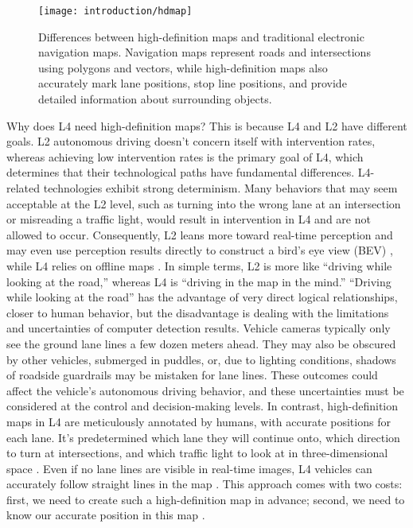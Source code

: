 \begin{figure}[!t]
	\centering
	\texttt{[image: introduction/hdmap]}
	\caption{Differences between high-definition maps and traditional electronic navigation maps. Navigation maps represent roads and intersections using polygons and vectors, while high-definition maps also accurately mark lane positions, stop line positions, and provide detailed information about surrounding objects.}
	\label{fig:hdmap}
\end{figure}

Why does L4 need high-definition maps? This is because L4 and L2 have different goals. L2 autonomous driving doesn't concern itself with intervention rates, whereas achieving low intervention rates is the primary goal of L4, which determines that their technological paths have fundamental differences. L4-related technologies exhibit strong determinism. Many behaviors that may seem acceptable at the L2 level, such as turning into the wrong lane at an intersection or misreading a traffic light, would result in intervention in L4 and are not allowed to occur. Consequently, L2 leans more toward real-time perception and may even use perception results directly to construct a bird's eye view (BEV) \cite{Sun2020, Ng2020, Hendy2020}, while L4 relies on offline maps \cite{Levinson2010, Wolcott2014, Matthaei2014}. In simple terms, L2 is more like ``driving while looking at the road,'' whereas L4 is ``driving in the map in the mind.'' ``Driving while looking at the road'' has the advantage of very direct logical relationships, closer to human behavior, but the disadvantage is dealing with the limitations and uncertainties of computer detection results. Vehicle cameras typically only see the ground lane lines a few dozen meters ahead. They may also be obscured by other vehicles, submerged in puddles, or, due to lighting conditions, shadows of roadside guardrails may be mistaken for lane lines. These outcomes could affect the vehicle's autonomous driving behavior, and these uncertainties must be considered at the control and decision-making levels. In contrast, high-definition maps in L4 are meticulously annotated by humans, with accurate positions for each lane. It's predetermined which lane they will continue onto, which direction to turn at intersections, and which traffic light to look at in three-dimensional space \cite{Ghallabi2018}. Even if no lane lines are visible in real-time images, L4 vehicles can accurately follow straight lines in the map \cite{Yang2018}. This approach comes with two costs: first, we need to create such a high-definition map in advance; second, we need to know our accurate position in this map \cite{Spangenberg2016, Levinson2007}.


